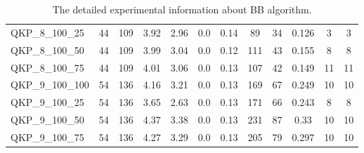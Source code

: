 \begin{table}[!h]
{\begin{tabular}{lccccccccccc}
QKP\_8\_100\_25 & 44 & 109 & 3.92 & 2.96 & 0.0 & 0.14 & 89 & 34 & 0.126 & 3 & 3\\
QKP\_8\_100\_50 & 44 & 109 & 3.99 & 3.04 & 0.0 & 0.12 & 111 & 43 & 0.155 & 8 & 8\\
QKP\_8\_100\_75 & 44 & 109 & 4.01 & 3.06 & 0.0 & 0.13 & 107 & 42 & 0.149 & 11 & 11\\
QKP\_9\_100\_100 & 54 & 136 & 4.16 & 3.21 & 0.0 & 0.13 & 169 & 67 & 0.249 & 10 & 10\\
QKP\_9\_100\_25 & 54 & 136 & 3.65 & 2.63 & 0.0 & 0.13 & 171 & 66 & 0.243 & 8 & 8\\
QKP\_9\_100\_50 & 54 & 136 & 4.37 & 3.38 & 0.0 & 0.13 & 231 & 87 & 0.33 & 10 & 10\\
QKP\_9\_100\_75 & 54 & 136 & 4.27 & 3.29 & 0.0 & 0.13 & 205 & 79 & 0.297 & 10 & 10\\
\bottomrule
\end{tabular}%
}%
\caption{The detailed experimental information about BB algorithm.}
\label{tab:table_$m}
\end{table}

